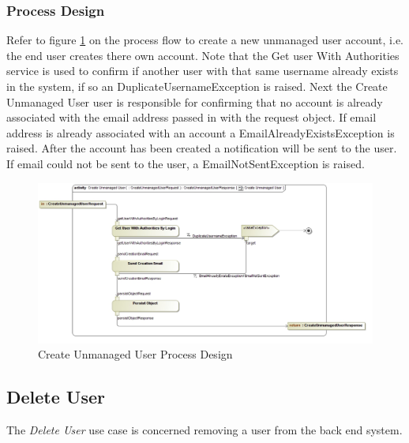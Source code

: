 \subsubsection{Process Design}
Refer to figure \ref{fig:CreateUnmanagedUserProcessDesign} on the process flow to
create a new unmanaged user account, i.e. the end user creates there own account.
Note that the Get user With Authorities service is used to confirm if another
user with that same username already exists in the system, if so an DuplicateUsernameException
is raised. Next the Create Unmanaged User user is responsible for confirming that
no account is already associated with the email address passed in with the request
object. If email address is already associated with an account a EmailAlreadyExistsException
is raised. After the account has been created a notification will be sent to the
user. If email could not be sent to the user, a EmailNotSentException is raised.
\begin{figure}[H]
  \begin{center}
  \includegraphics[scale=0.38]{../Diagrams and Charts/User Management/Create Unmanaged User Process Design.jpg}
  \caption{Create Unmanaged User Process Design}
  \label{fig:CreateUnmanagedUserProcessDesign}
  \end{center}
\end{figure}



\subsection{Delete User}
The \textit{Delete User} use case is concerned removing a user from the back end
system.

